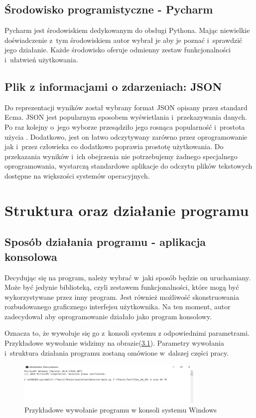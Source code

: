 \documentclass[eng,printmode]{mgr}
\begin{document}
\section{Środowisko programistyczne - Pycharm}
Pycharm jest środowiskiem dedykowanym do obsługi Pythona. Mając niewielkie doświadczenie z~tym środowiskiem autor wybrał je aby je poznać i~sprawdzić jego działanie. Każde środowisko oferuje odmienny zestaw funkcjonalności i~ułatwień użytkowania.

\section{Plik z informacjami o zdarzeniach: JSON}
Do reprezentacji wyników został wybrany format JSON opisany przez standard Ecma\newline\cite{JSON}. JSON jest popularnym sposobem wyświetlania i~przekazywania danych. Po raz kolejny o~jego wyborze przesądziło jego rosnąca popularność i~prostota użycia \cite{JSON_popular}. Dodatkowo, jest on łatwo odczytywany zarówno przez oprogramowanie jak i~przez człowieka co dodatkowo poprawia prostotę użytkowania. Do przekazania wyników i~ich obejrzenia nie potrzebujemy żadnego specjalnego oprogramowania, wystarczą standardowe aplikacje do odczytu plików tekstowych dostępne na większości systemów operacyjnych.
\chapter{Struktura oraz działanie programu} \label{struktura_dzialanie}
\section{Sposób działania programu - aplikacja konsolowa}\label{sposób}
Decydując się na program, należy wybrać w~jaki sposób będzie on uruchamiany. Może być jedynie biblioteką, czyli zestawem funkcjonalności, które mogą być wykorzystywane przez inny program. Jest również możliwość skonstruowania rozbudowanego graficznego interfejsu użytkownika. Na ten moment, autor zadecydował aby oprogramowanie działało jako program konsolowy. 

Oznacza to, że wywołuje się go z~konsoli systemu z odpowiednimi parametrami. Przykładowe wywołanie widzimy na obrazie(\ref{wywolanie}). Parametry wywołania i~struktura działania programu zostaną omówione w~dalszej części pracy.
\begin{figure}[hbtp]
\label{wywolanie}
\caption{Przykładowe wywołanie programu w konsoli systemu Windows}
\centering
\includegraphics[width=0.8\textwidth]{cmd_wywolanie.PNG}
\end{figure}
\end{document}
